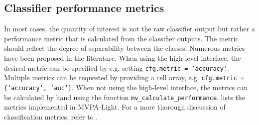 \documentclass[utf8]{frontiersSCNS} %
\newcommand{\ttt}[1]{\texttt{#1}}
\begin{document}
\subsection{Classifier performance metrics}\label{sec:metrics}

In most cases, the quantity of interest is not the raw classifier output but rather a performance metric that is calculated from the classifier outputs. The metric should reflect the degree of separability between the classes. Numerous metrics have been proposed in the literature.  When using the high-level interface, the desired metric can be specified by e.g. setting \ttt{cfg.metric = 'accuracy'}. Multiple metrics can be requested by providing a cell array, e.g. \ttt{cfg.metric = \{'accuracy', 'auc'\}}. When not using the high-level interface, the metrics can be calculated by hand using the function \ttt{mv\_calculate\_performance}.  lists the metrics implemented in MVPA-Light. For a more thorough discussion of classification metrics, refer to  \cite{Sokolova2009ATasks}.
\end{document}
